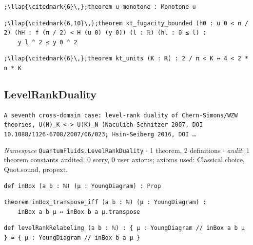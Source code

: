 \begin{lstlisting}[style=leancat]
;\llap{\citedmark{6}\,};theorem u_monotone : Monotone u
\end{lstlisting}

\begin{lstlisting}[style=leancat]
;\llap{\citedmark{6,10}\,};theorem kt_fugacity_bounded (h0 : u 0 < π / 2) (hH : f (π / 2) < H (u 0) (y 0)) (l : ℝ) (hl : 0 ≤ l) :
    y l ^ 2 ≤ y 0 ^ 2
\end{lstlisting}

\begin{lstlisting}[style=leancat]
;\llap{\citedmark{6}\,};theorem kt_units (K : ℝ) : 2 / π < K ↔ 4 < 2 * π * K
\end{lstlisting}

\subsection{LevelRankDuality}\label{appA:LevelRankDuality}
{\footnotesize\raggedright\texttt{A seventh cross-\allowbreak{}domain case: level-\allowbreak{}rank duality of Chern-\allowbreak{}Simons/\allowbreak{}WZW theories,\allowbreak{} U(N)\_\allowbreak{}K <-\allowbreak{}> U(K)\_\allowbreak{}N (Naculich-\allowbreak{}Schnitzer 2007,\allowbreak{} DOI 10.\allowbreak{}1088/\allowbreak{}1126-\allowbreak{}6708/\allowbreak{}2007/\allowbreak{}06/\allowbreak{}023; Hsin-\allowbreak{}Seiberg 2016,\allowbreak{} DOI …}\par}
{\footnotesize\raggedright\emph{Namespace} \texttt{QuantumFluids.\allowbreak{}LevelRankDuality} $\cdot$ 1 theorem, 2 definitions $\cdot$ \emph{audit}: 1 theorem constants audited, 0 sorry, 0 user axioms; axioms used: Classical.choice, Quot.sound, propext.\par}
\vspace{1pt}
\begin{lstlisting}[style=leancat]
def inBox (a b : ℕ) (μ : YoungDiagram) : Prop
\end{lstlisting}

\begin{lstlisting}[style=leancat]
theorem inBox_transpose_iff (a b : ℕ) (μ : YoungDiagram) :
    inBox a b μ ↔ inBox b a μ.transpose
\end{lstlisting}

\begin{lstlisting}[style=leancat]
def levelRankRelabeling (a b : ℕ) : { μ : YoungDiagram // inBox a b μ } ≃ { μ : YoungDiagram // inBox b a μ }
\end{lstlisting}

